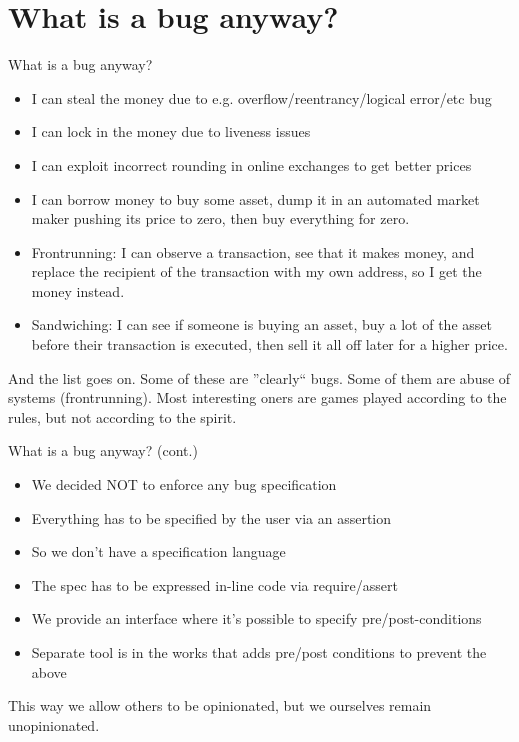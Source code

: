 \documentclass[aspectratio=169]{beamer}
\begin{document}


\section{What is a bug anyway?}
\begin{frame}{What is a bug anyway?}
\begin{itemize}
    \item I can steal the money due to e.g. overflow/reentrancy/logical error/etc bug
    \item I can lock in the money due to liveness issues
    \item I can exploit incorrect rounding in online exchanges to get better prices
    \item I can borrow money to buy some asset, dump it in an automated market maker pushing its price to zero, then buy everything for zero.
    \item Frontrunning: I can observe a transaction, see that it makes money, and replace the recipient of the transaction with my own address, so I get the money instead.
    \item Sandwiching: I can see if someone is buying an asset, buy a lot of the asset before their transaction is executed, then sell it all off later for a higher price.
\end{itemize}

\bigskip
And the list goes on. Some of these are ''clearly`` bugs. Some of them are abuse of systems (frontrunning). Most interesting oners are games played according to the rules, but not according to the spirit.
\end{frame}

\begin{frame}{What is a bug anyway? (cont.)}
\begin{itemize}
    \item We decided NOT to enforce any bug specification
    \item Everything has to be specified by the user via an assertion
    \item So we don't have a specification language
    \item The spec has to be expressed in-line code via require/assert
    \item We provide an interface where it's possible to specify pre/post-conditions
    \item Separate tool is in the works that adds pre/post conditions to prevent the above
\end{itemize}

\bigskip
This way we allow others to be opinionated, but we ourselves remain unopinionated.
\end{frame}
\end{document}
